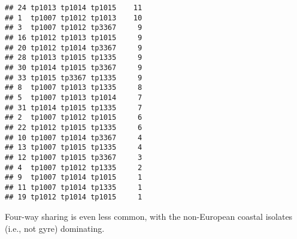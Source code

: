 \documentclass{article}\usepackage[]{graphicx}\usepackage[]{color}
\makeatletter
\newenvironment{kframe}{%
 \def\at@end@of@kframe{}%
 \ifinner\ifhmode%
  \def\at@end@of@kframe{\end{minipage}}%
  \begin{minipage}{\columnwidth}%
 \fi\fi%
 \def\FrameCommand##1{\hskip\@totalleftmargin \hskip-\fboxsep
 \colorbox{shadecolor}{##1}\hskip-\fboxsep
     \hskip-\linewidth \hskip-\@totalleftmargin \hskip\columnwidth}%
 \MakeFramed {\advance\hsize-\width
   \@totalleftmargin\z@ \linewidth\hsize
   \@setminipage}}%
 {\par\unskip\endMakeFramed%
 \at@end@of@kframe}
\newenvironment{knitrout}{}{} %
\makeatother
\begin{document}
\begin{knitrout}
\begin{kframe}
\begin{verbatim}
## 24 tp1013 tp1014 tp1015    11
## 1  tp1007 tp1012 tp1013    10
## 3  tp1007 tp1012 tp3367     9
## 16 tp1012 tp1013 tp1015     9
## 20 tp1012 tp1014 tp3367     9
## 28 tp1013 tp1015 tp1335     9
## 30 tp1014 tp1015 tp3367     9
## 33 tp1015 tp3367 tp1335     9
## 8  tp1007 tp1013 tp1335     8
## 5  tp1007 tp1013 tp1014     7
## 31 tp1014 tp1015 tp1335     7
## 2  tp1007 tp1012 tp1015     6
## 22 tp1012 tp1015 tp1335     6
## 10 tp1007 tp1014 tp3367     4
## 13 tp1007 tp1015 tp1335     4
## 12 tp1007 tp1015 tp3367     3
## 4  tp1007 tp1012 tp1335     2
## 9  tp1007 tp1014 tp1015     1
## 11 tp1007 tp1014 tp1335     1
## 19 tp1012 tp1014 tp1015     1
\end{verbatim}
\end{kframe}
\end{knitrout}


Four-way sharing is even less common, with the non-European coastal isolates (i.e., not gyre) dominating.
\end{document}
